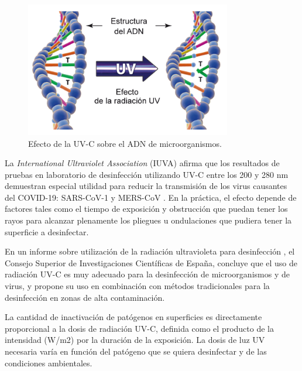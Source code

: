 \begin{figure}[h]
	\centering
	\includegraphics[width=9cm]{./Figures/adn.png}
	\caption{Efecto de la UV-C sobre el ADN de microorganismos\protect\footnotemark.}
	\label{fig:adn}
\end{figure}

La \emph{International Ultraviolet Association}  (IUVA) afirma que los resultados de pruebas en laboratorio de desinfección utilizando UV-C entre los 200 y 280 nm demuestran especial utilidad para reducir la transmisión de los virus causantes del COVID-19:  SARS-CoV-1 y MERS-CoV \citep{IUA}. En la práctica, el efecto depende de factores tales como  el tiempo de exposición y obstrucción que puedan tener los rayos para alcanzar plenamente los pliegues u ondulaciones que pudiera tener la superficie a desinfectar. 

En un informe sobre utilización de la radiación ultravioleta para desinfección \citep{CSIC}, el Consejo Superior de Investigaciones Científicas de España, concluye que el uso de radiación UV-C es muy adecuado para la desinfección de microorganismos y de virus, y propone su uso en combinación con métodos tradicionales para la desinfección en  zonas de alta contaminación.

La cantidad de inactivación de patógenos en superficies es directamente proporcional a la dosis de radiación UV-C, definida como el producto de la intensidad (W/m2) por la duración de la exposición. La dosis de luz UV necesaria varía en función del patógeno que se quiera desinfectar y de las condiciones ambientales\citep{CIE}.

